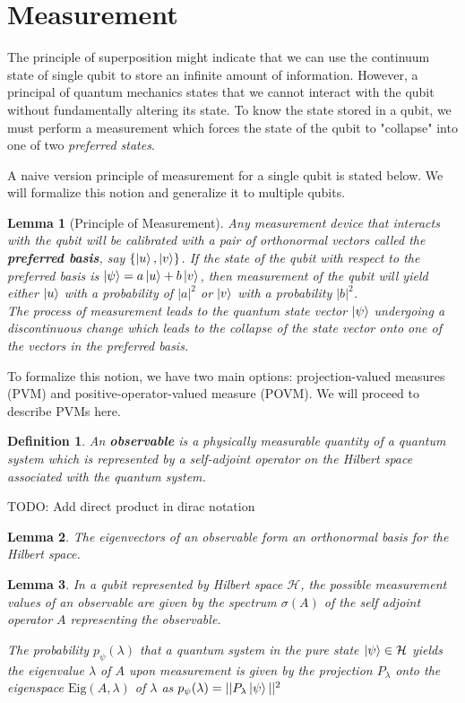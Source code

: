 \documentclass[12pt,twoside,fleqn]{report}
\theoremstyle{thmstyle}
\newtheorem{defn}{Definition}[chapter]
\newtheorem{lemma}{Lemma}[chapter]
\begin{document}
\section{Measurement}
The principle of superposition might indicate that we can use the continuum state of single qubit to store an infinite amount of information. However, a principal of quantum mechanics states that we cannot interact with the qubit without fundamentally altering its state. To know the state stored in a qubit, we must perform a measurement which forces the state of the qubit to "collapse" into one of two \textit{preferred states}.

A naive version principle of measurement for a single qubit is stated below. We will formalize this notion and generalize it to multiple qubits.
\begin{lemma}[Principle of Measurement]
    Any measurement device that interacts with the qubit will be calibrated with a pair of orthonormal vectors called the \textbf{preferred basis}, say $\{ \ket{u}, \ket{v} \}$. If the state of the qubit with respect to the preferred basis is $\ket{\psi} = a \ket{u} + b \ket{v}$, then measurement of the qubit will yield either $\ket{u}$ with a probability of $|a|^2$ or $\ket{v}$ with a probability $|b|^2$. \\
The process of measurement leads to the quantum state vector $\ket{\psi}$ undergoing a discontinuous change which leads to the collapse of the state vector onto one of the vectors in the preferred basis.
\end{lemma}

To formalize this notion, we have two main options: projection-valued measures (PVM) and positive-operator-valued measure (POVM). We will proceed to describe PVMs here.

\begin{defn}
    An \textbf{observable} is a physically measurable quantity of a quantum system which is represented by a self-adjoint operator on the Hilbert space associated with the quantum system.
\end{defn}

TODO: Add direct product in dirac notation


\begin{lemma}
    The eigenvectors of an observable form an orthonormal basis for the Hilbert space.
\end{lemma}

\begin{lemma}
    In a qubit represented by Hilbert space $\mathcal{H}$, the possible measurement values of an observable are given by the spectrum $\sigma(A)$ of the self adjoint operator $A$ representing the observable.

    The probability $p_\psi(\lambda)$ that a quantum system in the pure state $\ket{\psi} \in \mathcal{H}$ yields the eigenvalue $\lambda$ of $A$ upon measurement is given by the projection $P_\lambda$ onto the eigenspace $\text{Eig}(A, \lambda)$ of $\lambda$ as $p_\psi(\lambda) = || P_\lambda \ket{\psi} ||^2$
\end{lemma}
\end{document}
